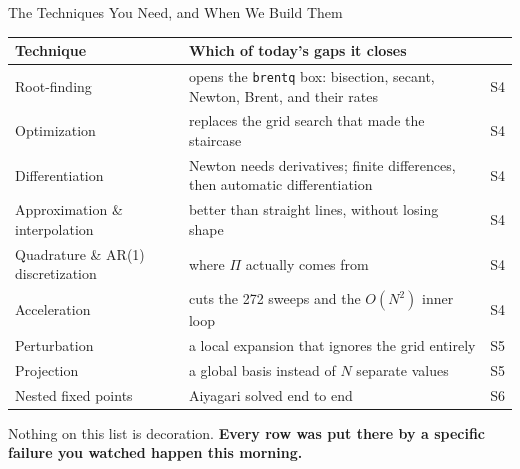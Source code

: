 \begin{frame}{The Techniques You Need, and When We Build Them}
\renewcommand{\arraystretch}{1.15}
\begin{center}\footnotesize
\begin{tabularx}{\linewidth}{@{}>{\raggedright\arraybackslash}p{3.3cm} >{\raggedright\arraybackslash}X c@{}}
\toprule
\textbf{Technique} & \textbf{Which of today's gaps it closes} & \\
\midrule
Root-finding & opens the \texttt{brentq} box: bisection, secant, Newton, Brent, and their rates & S4 \\
Optimization & replaces the grid search that made the staircase & S4 \\
Differentiation & Newton needs derivatives; finite differences, then automatic differentiation & S4 \\
Approximation \& interpolation & better than straight lines, without losing shape & S4 \\
Quadrature \& AR(1) discretization & where $\Pi$ actually comes from & S4 \\
Acceleration & cuts the 272 sweeps and the $O(N^2)$ inner loop & S4 \\
Perturbation & a local expansion that ignores the grid entirely & S5 \\
Projection & a global basis instead of $N$ separate values & S5 \\
Nested fixed points & Aiyagari solved end to end & S6 \\
\bottomrule
\end{tabularx}
\end{center}
\vspace{1mm}
\begin{conceptbox}\small
Nothing on this list is decoration. \textbf{Every row was put there by a specific failure you watched happen this morning.}
\end{conceptbox}
\end{frame}

